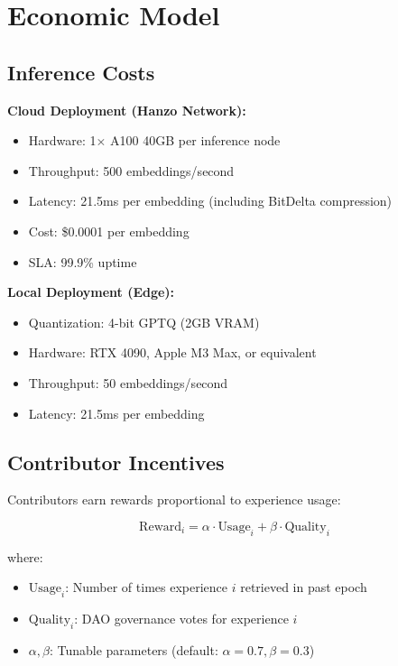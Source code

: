 \section{Economic Model}


\subsection{Inference Costs}

\textbf{Cloud Deployment (Hanzo Network):}
\begin{itemize}
\item Hardware: 1$\times$ A100 40GB per inference node
\item Throughput: 500 embeddings/second
\item Latency: 21.5ms per embedding (including BitDelta compression)
\item Cost: \$0.0001 per embedding
\item SLA: 99.9\% uptime
\end{itemize}

\textbf{Local Deployment (Edge):}
\begin{itemize}
\item Quantization: 4-bit GPTQ (2GB VRAM)
\item Hardware: RTX 4090, Apple M3 Max, or equivalent
\item Throughput: 50 embeddings/second
\item Latency: 21.5ms per embedding
\end{itemize}

\subsection{Contributor Incentives}

Contributors earn rewards proportional to experience usage:

\begin{equation}
\text{Reward}_i = \alpha \cdot \text{Usage}_i + \beta \cdot \text{Quality}_i
\end{equation}

where:
\begin{itemize}
\item $\text{Usage}_i$: Number of times experience $i$ retrieved in past epoch
\item $\text{Quality}_i$: DAO governance votes for experience $i$
\item $\alpha, \beta$: Tunable parameters (default: $\alpha=0.7, \beta=0.3$)
\end{itemize}

